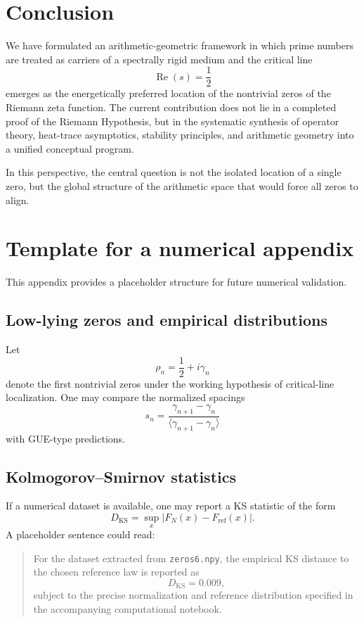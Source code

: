 \documentclass[11pt,a4paper]{amsart}
\theoremstyle{plain}
\theoremstyle{definition}
\theoremstyle{remark}
\newcommand{\RePart}{\operatorname{Re}}
\begin{document}
	\section{Conclusion}
	
	We have formulated an arithmetic-geometric framework in which prime numbers are treated as carriers of a spectrally rigid medium and the critical line
	\[
	\RePart(s)=\frac12
	\]
	emerges as the energetically preferred location of the nontrivial zeros of the Riemann zeta function. The current contribution does not lie in a completed proof of the Riemann Hypothesis, but in the systematic synthesis of operator theory, heat-trace asymptotics, stability principles, and arithmetic geometry into a unified conceptual program.
	
	In this perspective, the central question is not the isolated location of a single zero, but the global structure of the arithmetic space that would force all zeros to align.
	
	\appendix
	
	\section{Template for a numerical appendix}
	
	This appendix provides a placeholder structure for future numerical validation.
	
	\subsection{Low-lying zeros and empirical distributions}
	
	Let
	\[
	\rho_n=\frac12+i\gamma_n
	\]
	denote the first nontrivial zeros under the working hypothesis of critical-line localization. One may compare the normalized spacings
	\[
	s_n=\frac{\gamma_{n+1}-\gamma_n}{\langle \gamma_{n+1}-\gamma_n\rangle}
	\]
	with GUE-type predictions.
	
	\subsection{Kolmogorov--Smirnov statistics}
	
	If a numerical dataset is available, one may report a KS statistic of the form
	\[
	D_{\mathrm{KS}} = \sup_x |F_N(x)-F_{\mathrm{ref}}(x)|.
	\]
	A placeholder sentence could read:
	
	\begin{quote}
		For the dataset extracted from \texttt{zeros6.npy}, the empirical KS distance to the chosen reference law is reported as
		\[
		D_{\mathrm{KS}} = 0.009,
		\]
		subject to the precise normalization and reference distribution specified in the accompanying computational notebook.
	\end{quote}
	
\end{document}
